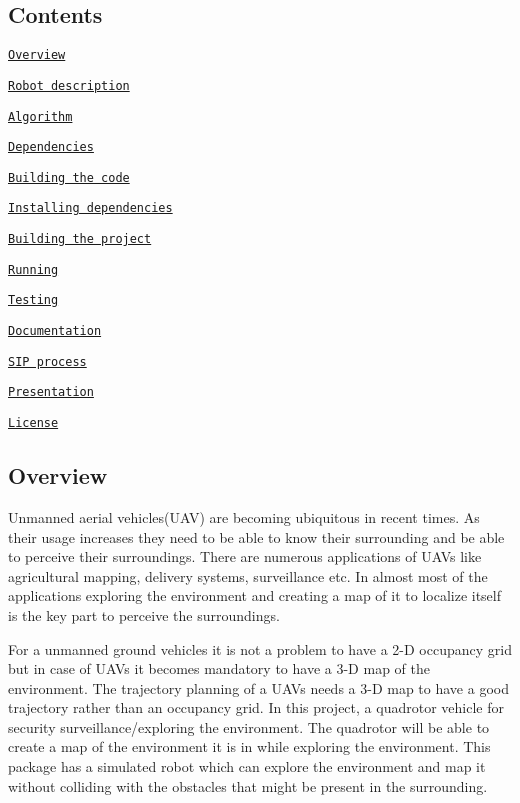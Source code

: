 \href{https://travis-ci.org/nr-parikh/voyager}{\tt } \href{https://github.com/nr-parikh/voyager/blob/master/LICENSE}{\tt }

\subsection*{Contents}


\begin{DoxyItemize}
\item \href{#overview}{\tt Overview}
\item \href{#description}{\tt Robot description}
\item \href{#algorithm}{\tt Algorithm}
\item \href{#dependencies}{\tt Dependencies}
\item \href{#building}{\tt Building the code}
\begin{DoxyItemize}
\item \href{#install-dependencies}{\tt Installing dependencies}
\item \href{#build-project}{\tt Building the project}
\end{DoxyItemize}
\item \href{#running}{\tt Running}
\item \href{#testing}{\tt Testing}
\item \href{#docs}{\tt Documentation}
\item \href{#sip}{\tt S\+IP process}
\item \href{#present}{\tt Presentation}
\item \href{#lic}{\tt License}
\end{DoxyItemize}

\subsection*{\label{_overview}%
 Overview}

Unmanned aerial vehicles(\+U\+A\+V) are becoming ubiquitous in recent times. As their usage increases they need to be able to know their surrounding and be able to perceive their surroundings. There are numerous applications of U\+A\+Vs like agricultural mapping, delivery systems, surveillance etc. In almost most of the applications exploring the environment and creating a map of it to localize itself is the key part to perceive the surroundings.

For a unmanned ground vehicles it is not a problem to have a 2-\/D occupancy grid but in case of U\+A\+Vs it becomes mandatory to have a 3-\/D map of the environment. The trajectory planning of a U\+A\+Vs needs a 3-\/D map to have a good trajectory rather than an occupancy grid. In this project, a quadrotor vehicle for security surveillance/exploring the environment. The quadrotor will be able to create a map of the environment it is in while exploring the environment. This package has a simulated robot which can explore the environment and map it without colliding with the obstacles that might be present in the surrounding.

